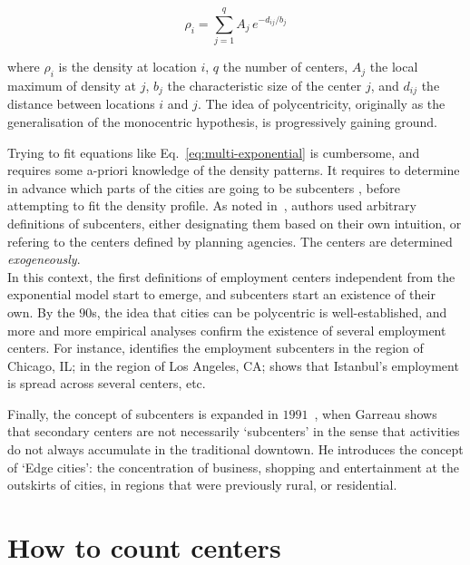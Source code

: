 \begin{equation}
    \rho_i = \sum_{j=1}^{q} A_j\,e^{-d_{ij}/b_j}
    \label{eq:multi-exponential}
\end{equation}

where $\rho_i$ is the density at location $i$, $q$ the number of centers, $A_j$
the local maximum of density at $j$, $b_j$ the characteristic size of the center
$j$, and $d_{ij}$ the distance between locations $i$ and $j$. The idea of
polycentricity, originally as the generalisation of the monocentric hypothesis,
is progressively gaining ground. 

Trying to fit equations like Eq.~\ref{eq:multi-exponential} is cumbersome, and
requires some a-priori knowledge of the density patterns. It requires to
determine in advance which parts of the cities are going to be subcenters
,
before attempting to fit the density profile. As noted in~\cite{Giuliano:1991},
authors used arbitrary definitions of subcenters, either designating them based
on their own intuition, or refering to the centers defined by planning agencies.
The centers are determined \emph{exogeneously}.
\\

In this context, the first definitions of employment centers independent from
the exponential model start to emerge, and subcenters start an existence of
their own. By the $90$s, the idea that cities can be polycentric is
well-established, and more and more empirical analyses confirm the existence of
several employment centers.  For instance, \cite{McDonald:1987} identifies the
employment subcenters in the region of Chicago, IL; \cite{Giuliano:1991} in the
region of Los Angeles, CA; \cite{Dokmeci:1994} shows that Istanbul's employment
is spread across several centers, etc. 

Finally, the concept of subcenters is expanded in $1991$~\cite{Garreau:1991}, when
Garreau shows that secondary centers are not necessarily `subcenters' in the
sense that activities do not always accumulate in the traditional downtown. He
introduces the concept of `Edge cities': the concentration of business, shopping
and entertainment at the outskirts of cities, in regions that were previously
rural, or residential.\\

\section{How to count centers}
\label{sec:how_to_measure_polycentrity}

